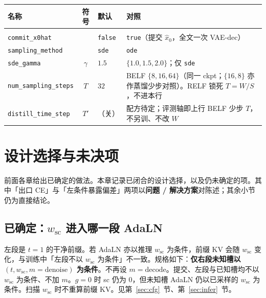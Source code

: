 \documentclass[UTF8,a4paper,11pt]{ctexart}
\begin{document}
{\small
\setlength{\tabcolsep}{4pt}
\begin{center}
\begin{tabularx}{\textwidth}{@{}
  >{\raggedright\arraybackslash}p{}
  c
  >{\raggedright\arraybackslash}p{}
  >{\raggedright\arraybackslash}X
  @{}}
\toprule
名称 & 符号 & 默认 & 对照 \\
\midrule
\multicolumn{4}{@{}l}{\textit{推理}} \\
\texttt{commit\_x0hat} & & \texttt{false} & \texttt{true}（提交 \(\hat x_0\)，全文一次 VAE-dec） \\
\texttt{sampling\_method} & & \texttt{sde} & \texttt{ode} \\
\texttt{sde\_gamma} & \(\gamma\) & \(1.5\) & \(\{1.0,1.5,2.0\}\)；仅 \texttt{sde} \\
\texttt{num\_sampling\_steps} & \(T\) & \(32\) & BELF \(\{8,16,64\}\)（同一 ckpt；\(\{16,8\}\) 亦作蒸馏少步对照）。RELF 锁死 \(T=W/S\)，不进本行 \\
\texttt{distill\_time\_step} & \(T'\) & （关） & 配方待定；评测轴即上行 BELF 少步 \(T\)，不另训、不改 \(W\) \\
\bottomrule
\end{tabularx}
\end{center}
}

\section{设计选择与未决项}
\label{sec:open}

前面各章给出已确定的做法。本章记录已闭合的设计选择，以及仍未确定的项。其中「出口 CE」与「左条件暴露偏差」两项以\textbf{问题 / 解决方案}对陈述；其余小节仍为直接结论。

\subsection{已确定：\texorpdfstring{\(w_{\mathrm{sc}}\)}{w\_sc} 进入哪一段 AdaLN}

左段是 \(t=1\) 的干净前缀。若 AdaLN 亦以推理 \(w_{\mathrm{sc}}\) 为条件，前缀 KV 会随 \(w_{\mathrm{sc}}\) 变化，与训练中「左段不以 \(w_{\mathrm{sc}}\) 为条件」不一致。规格如下：\textbf{仅右段未知槽以 \((t,w_{\mathrm{sc}},m=\mathrm{denoise})\) 为条件}。不再设 \(m=\mathrm{decode}\)。提交、左段与已知槽均不以 \(w_{\mathrm{sc}}\) 为条件、不加 \(m\)。\(g=0\) 时 sc 仍为 \(0\)，但未知槽 AdaLN 仍以已采样的 \(w_{\mathrm{sc}}\) 为条件。扫描 \(w_{\mathrm{sc}}\) 时不重算前缀 KV。见第~\ref{sec:cfg}~节、第~\ref{sec:infer}~节。
\end{document}
